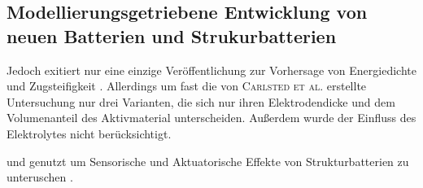 \subsection{Modellierungsgetriebene Entwicklung von neuen Batterien und Strukurbatterien}

Jedoch exitiert nur eine einzige Veröffentlichung zur Vorhersage von Energiedichte und Zugsteifigkeit \cite{Carlstedt2018}. Allerdings um fast die von \textsc{Carlsted et al.} erstellte Untersuchung nur drei Varianten, die sich nur ihren Elektrodendicke und dem Volumenanteil des Aktivmaterial unterscheiden. Außerdem wurde der Einfluss des Elektrolytes nicht berücksichtigt.

und genutzt um Sensorische und Aktuatorische Effekte von Strukturbatterien zu unteruschen \cite{Carlstedt2023}.











   


